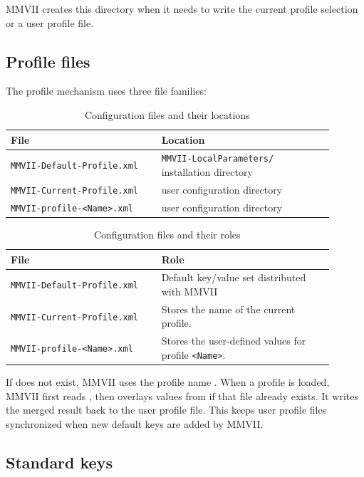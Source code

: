 \documentclass[a4paper]{article}
\begin{document}
MMVII creates this directory when it needs to write the current profile selection
or a user profile file.

\subsection{Profile files}

The profile mechanism uses three file families:

\begin{table}[h]
\centering
\caption{Configuration files and their locations}
\begin{tabular}{|p{0.42\linewidth}|p{0.48\linewidth}|}
\hline
File & Location \\
\hline
{\tt MMVII-Default-Profile.xml} &
{\tt MMVII-LocalParameters/} installation directory \\
\hline
{\tt MMVII-Current-Profile.xml} &
user configuration directory \\
\hline
{\tt MMVII-profile-\textless Name\textgreater.xml} &
user configuration directory \\
\hline
\end{tabular}
\end{table}

\begin{table}[h]
\centering
\caption{Configuration files and their roles}
\begin{tabular}{|p{0.42\linewidth}|p{0.48\linewidth}|}
\hline
File & Role \\
\hline
{\tt MMVII-Default-Profile.xml} &
Default key/value set distributed with MMVII \\
\hline
{\tt MMVII-Current-Profile.xml} &
Stores the name of the current profile. \\
\hline
{\tt MMVII-profile-\textless Name\textgreater.xml} &
Stores the user-defined values for profile {\tt \textless Name\textgreater}. \\
\hline
\end{tabular}
\end{table}


If  does not exist, MMVII uses the profile name
.  When a profile is loaded, MMVII first reads
, then overlays values from
 if that file already exists.  It writes the
merged result back to the user profile file.  This keeps user profile files
synchronized when new default keys are added by MMVII.

\subsection{Standard keys}
\end{document}

